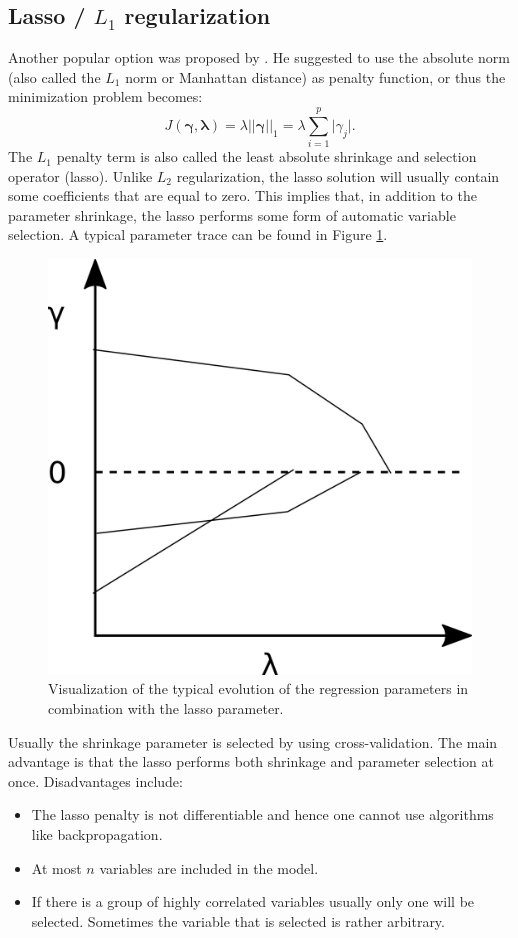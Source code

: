 \subsection{Lasso / $L_1$ regularization}
\label{sec:Lasso}
Another popular option was proposed by \cite{tibshirani_regression_1996}. He suggested to use the absolute norm (also called the $L_1$ norm or Manhattan distance) as penalty function, or thus the minimization problem becomes: \[J(\bm{\gamma},\bm{\lambda}) = \lambda \vert \vert \bm{\gamma} \vert \vert _1 = \lambda \sum_{i=1}^p \vert \gamma_j \vert.\]
The $L_1$ penalty term is also called the least absolute shrinkage and selection operator (lasso). Unlike $L_2$ regularization, the lasso solution will usually contain some coefficients that are equal to zero. This implies that, in addition to the parameter shrinkage, the lasso performs some form of automatic variable selection. A typical parameter trace can be found in Figure \ref{fig:LassoTrace}. \\
\begin{figure}[!htb]
\centering
\includegraphics[scale=0.75]{VectorGraphics/lassoTrace.png}
\caption{\label{fig:LassoTrace}Visualization of the typical evolution of the regression parameters in combination with the lasso parameter.}
\end{figure}

Usually the shrinkage parameter is selected by using cross-validation. The main advantage is that the lasso performs both shrinkage and parameter selection at once. Disadvantages include:
\begin{itemize}
\item The lasso penalty is not differentiable and hence one cannot use algorithms like backpropagation.
\item At most $n$ variables are included in the model.
\item If there is a group of highly correlated variables usually only one will be selected. Sometimes the variable that is selected is rather arbitrary.
\end{itemize}

